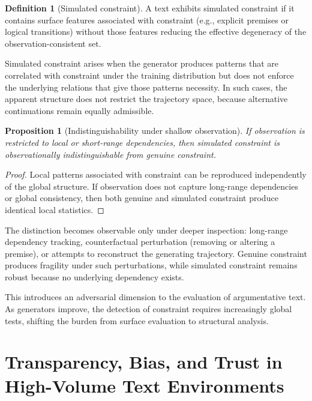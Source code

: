 \documentclass[12pt, oneside]{article}
\theoremstyle{plain}
\newtheorem{proposition}[theorem]{Proposition}
\theoremstyle{definition}
\newtheorem{definition}[theorem]{Definition}
\theoremstyle{remark}
\begin{document}
\begin{definition}[Simulated constraint]
A text exhibits simulated constraint if it contains surface features associated
with constraint (e.g., explicit premises or logical transitions) without those
features reducing the effective degeneracy of the observation-consistent set.
\end{definition}

Simulated constraint arises when the generator produces patterns that are correlated
with constraint under the training distribution but does not enforce the underlying
relations that give those patterns necessity. In such cases, the apparent structure
does not restrict the trajectory space, because alternative continuations remain
equally admissible.

\begin{proposition}[Indistinguishability under shallow observation]
If observation is restricted to local or short-range dependencies, then simulated
constraint is observationally indistinguishable from genuine constraint.
\end{proposition}

\begin{proof}
Local patterns associated with constraint can be reproduced independently of the
global structure. If observation does not capture long-range dependencies or
global consistency, then both genuine and simulated constraint produce identical
local statistics.
\end{proof}

The distinction becomes observable only under deeper inspection: long-range
dependency tracking, counterfactual perturbation (removing or altering a premise),
or attempts to reconstruct the generating trajectory. Genuine constraint produces
fragility under such perturbations, while simulated constraint remains robust
because no underlying dependency exists.

This introduces an adversarial dimension to the evaluation of argumentative text.
As generators improve, the detection of constraint requires increasingly global
tests, shifting the burden from surface evaluation to structural analysis.

\section{Transparency, Bias, and Trust in High-Volume Text Environments}
\end{document}

